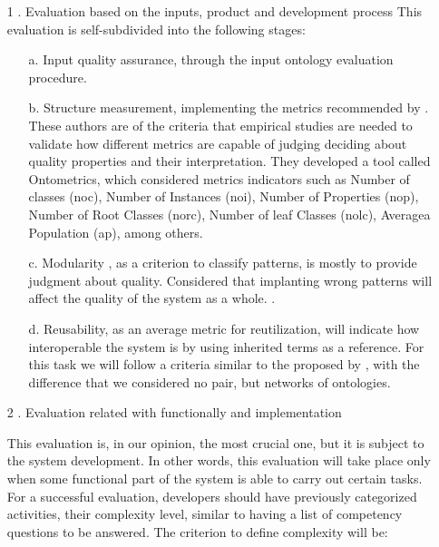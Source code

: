 \begin{enumerate}
	\item[1].	 Evaluation based on the inputs, product and development process
	This evaluation is self-subdivided into the following stages:
	\begin{enumerate}
		
		\item[a.] Input quality assurance, through the input ontology evaluation procedure.
		\item[b.] Structure measurement, implementing the metrics recommended   by \cite{manouselis_exploring_2010}. These authors are of the criteria that empirical studies are needed to validate how different metrics are capable of judging deciding about quality properties and their interpretation. They developed a tool called Ontometrics, which considered metrics indicators such as Number of classes (noc), Number of Instances (noi), Number of Properties (nop), Number of Root Classes (norc), Number of leaf Classes (nolc), Averagea Population (ap), among others. 
		
		\item[c.] Modularity  , as a criterion to classify patterns, is mostly to provide judgment about quality.  Considered that implanting wrong patterns will affect the quality of the system as a whole. \cite{randelli_introducing_2010}.
		
		\item[d.] Reusability, as an average metric for reutilization, will indicate how interoperable   the system is by using inherited terms as a reference. For this task we will follow a criteria similar to the proposed by \cite{spiliopoulos_discovery_2010}, with the difference that we considered no pair, but networks of ontologies. 
		
	\end{enumerate}
	
	\item[2]. 	Evaluation related with functionally and implementation
	
	This evaluation is, in our opinion, the most crucial one, but it is subject to the system development. In other words, this evaluation will take place only when some functional part of the system is able to carry out certain tasks. For a successful evaluation, developers should have previously categorized activities, their complexity level, similar to having a list of competency questions to be answered. The criterion to define complexity will be:
	
	
	\begin{enumerate}
		

\end{enumerate}
\end{enumerate}
